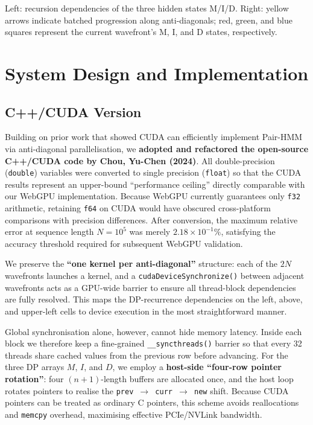 \documentclass[PhD]{PHlab-thesis}
\begin{document}
Left: recursion dependencies of the three hidden states M/I/D. Right: yellow arrows indicate batched progression along anti-diagonals; red, green, and blue squares represent the current wavefront’s M, I, and D states, respectively.

\section{System Design and Implementation}
\subsection{C++/CUDA Version}
Building on prior work that showed CUDA can efficiently implement Pair-HMM via anti-diagonal parallelisation, we \textbf{adopted and refactored the open-source C++/CUDA code by Chou, Yu-Chen (2024)}. All double-precision (\texttt{double}) variables were converted to single precision (\texttt{float}) so that the CUDA results represent an upper-bound ``performance ceiling'' directly comparable with our WebGPU implementation. Because WebGPU currently guarantees only \texttt{f32} arithmetic, retaining \texttt{f64} on CUDA would have obscured cross-platform comparisons with precision differences. After conversion, the maximum relative error at sequence length $N = 10^5$ was merely $2.18 \times 10^{-1}\%$, satisfying the accuracy threshold required for subsequent WebGPU validation.

We preserve the \textbf{``one kernel per anti-diagonal''} structure: each of the $2N$ wavefronts launches a kernel, and a \texttt{cudaDeviceSynchronize()} between adjacent wavefronts acts as a GPU-wide barrier to ensure all thread-block dependencies are fully resolved. This maps the DP-recurrence dependencies on the left, above, and upper-left cells to device execution in the most straightforward manner.

Global synchronisation alone, however, cannot hide memory latency. Inside each block we therefore keep a fine-grained \texttt{\_\_syncthreads()} barrier so that every 32 threads share cached values from the previous row before advancing. For the three DP arrays $M$, $I$, and $D$, we employ a \textbf{host-side ``four-row pointer rotation''}: four $(n+1)$-length buffers are allocated once, and the host loop rotates pointers to realise the \texttt{prev $\rightarrow$ curr $\rightarrow$ new} shift. Because CUDA pointers can be treated as ordinary C pointers, this scheme avoids reallocations and \texttt{memcpy} overhead, maximising effective PCIe/NVLink bandwidth.
\end{document}
